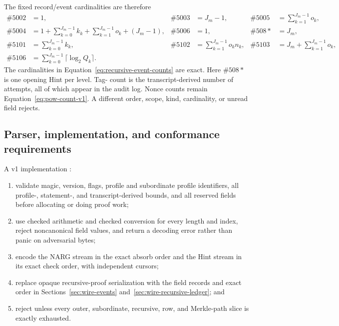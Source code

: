 The fixed record/event cardinalities are therefore
\begin{equation}
 \begin{aligned}
  \#5002&=1,& \#5003&=J_m-1,& \#5005&=\sum_{k=1}^{J_m-1}o_k,\\
  \#5004&=1+\sum_{k=0}^{J_m-1}k_k
     +\sum_{k=1}^{J_m-1}o_k+(J_m-1),&
  \#5006&=1,& \#508{*}&=J_m,\\
  \#5101&=\sum_{k=0}^{J_m-1}k_k,&
  \#5102&=\sum_{k=1}^{J_m-1}o_kn_k,&
  \#5103&=J_m+\sum_{k=1}^{J_m-1}o_k,\\
  \#5106&=\sum_{k=0}^{J_m-1}\lceil\log_2Q_k\rceil.
 \end{aligned}
 \label{eq:recursive-event-counts}
\end{equation}
The cardinalities in Equation~\eqref{eq:recursive-event-counts} are exact.
Here $\#508{*}$ is one opening Hint per level.  Tag- count is the
transcript-derived number of attempts, all of which appear in the audit log.
Nonce counts remain Equation~\eqref{eq:pow-count-v1}.  A different order,
scope, kind, cardinality, or unread field rejects.

\subsection{Parser, implementation, and conformance requirements}
\label{sec:wire-conformance}

A v1 implementation \must{}:
\begin{enumerate}
 \item validate magic, version, flags, profile and subordinate profile
 identifiers, all profile-, statement-, and transcript-derived bounds, and all
 reserved fields before allocating or doing proof work;
 \item use checked arithmetic and checked conversion for every length and
 index, reject noncanonical field values, and return a decoding error rather
 than panic on adversarial bytes;
 \item encode the NARG stream in the exact absorb order and the Hint stream in
 its exact check order, with independent cursors;
 \item replace opaque recursive-proof serialization with the field records and
 exact order in Sections~\ref{sec:wire-events}
 and~\ref{sec:wire-recursive-ledger}; and
 \item reject unless every outer, subordinate, recursive, row, and Merkle-path
 slice is exactly exhausted.
\end{enumerate}

